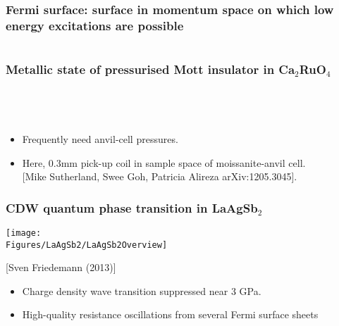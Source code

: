 \begin{frame}[label=FermiSurface]
  \frametitle{Fermi surface: surface in momentum space on which low energy excitations are possible}

\begin{columns}[t]

\end{columns}

\end{frame}



\begin{frame}
\frametitle{Metallic state of pressurised Mott insulator in Ca$_2$RuO$_4$}
\begin{columns}[t]
\centerline{~}
\centerline{~}
\end{columns}
\begin{itemize}
\item{Frequently need anvil-cell pressures.}
\item <2->Here, 0.3mm pick-up coil in sample space of moissanite-anvil
  cell.\\ {\small[Mike Sutherland, Swee Goh, Patricia Alireza arXiv:1205.3045].}
\end{itemize}
\end{frame}




\begin{frame}
\frametitle{CDW quantum phase transition in LaAgSb$_2$}
\centerline{\texttt{[image: \\Figures/LaAgSb2/LaAgSb2Overview]}}
\centerline{\small[Sven Friedemann (2013)]}
\begin{itemize}
\item{Charge density wave transition suppressed near 3 GPa.}
\item {High-quality resistance oscillations from several Fermi surface sheets}
\end{itemize}
\end{frame}



